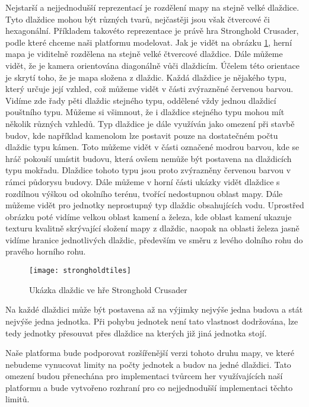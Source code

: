 Nejstarší a nejjednodušší reprezentací je rozdělení mapy na stejně velké dlaždice. Tyto dlaždice mohou být různých tvarů, nejčastěji jsou však čtvercové či hexagonální. Příkladem takovéto reprezentace je právě hra Stronghold Crusader, podle které chceme naši platformu modelovat. Jak je vidět na obrázku  \ref{fig:tiletype}, herní mapa je viditelně rozdělena na stejně velké čtvercové dlaždice. Dále můžeme vidět, že je kamera orientována diagonálně vůči dlaždicím. Účelem této orientace je skrytí toho, že je mapa složena z dlaždic. Každá dlaždice je nějakého typu, který určuje její vzhled, což můžeme vidět v části zvýrazněné červenou barvou. Vidíme zde řady pěti dlaždic stejného typu, oddělené vždy jednou dlaždicí pouštního typu. Můžeme si všimnout, že i dlaždice stejného typu mohou mít několik různých vzhledů. Typ dlaždice je dále využíván jako omezení při stavbě budov, kde například kamenolom lze postavit pouze na dostatečném počtu dlaždic typu kámen. Toto můžeme vidět v části označené modrou barvou, kde se hráč pokouší umístit budovu, která ovšem nemůže být postavena na dlaždicích typu mokřadu. Dlaždice tohoto typu jsou proto zvýrazněny červenou barvou v rámci půdorysu budovy. Dále můžeme v horní části ukázky vidět dlaždice s rozdílnou výškou od okolního terénu, tvořící nedostupnou oblast mapy. Dále můžeme vidět pro jednotky neprostupný typ dlaždic obsahujících vodu. Uprostřed obrázku poté vidíme velkou oblast kamení a železa, kde oblast kamení ukazuje texturu kvalitně skrývající složení mapy z dlaždic, naopak na oblasti železa jasně vidíme hranice jednotlivých dlaždic, především ve směru z levého dolního rohu do pravého horního rohu.

\begin{figure}[h]
	\centering
	\texttt{[image: strongholdtiles]}
	\caption{Ukázka dlaždic ve hře Stronghold Crusader}
	\label{fig:tiletype}
\end{figure}

Na každé dlaždici může být postavena až na výjimky nejvýše jedna budova a stát nejvýše jedna jednotka. Při pohybu jednotek není tato vlastnost dodržována, lze tedy jednotky přesouvat přes dlaždice na kterých již jiná jednotka stojí. 

Naše platforma bude podporovat rozšířenější verzi tohoto druhu mapy, ve které nebudeme vynucovat limity na počty jednotek a budov na jedné dlaždici. Tato omezení budou přenechána pro implementaci tvůrcem her využívajících naší platformu a bude vytvořeno rozhraní pro co nejjednodušší implementaci těchto limitů. 

